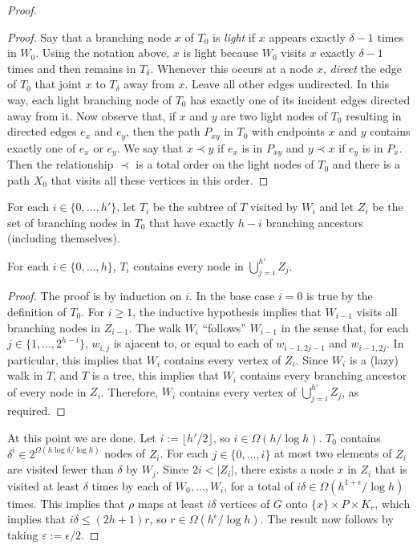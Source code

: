 \documentclass{patmorin}
\newcommand{\defin}[1]{\emph{\color{brightmaroon}#1}}
\begin{document}
\begin{proof}
  \begin{proof}
    Say that a branching node $x$ of $T_0$ is \defin{light} if $x$ appears exactly $\delta-1$ times in $W_0$. Using the notation above, $x$ is light because $W_0$ visits $x$ exactly $\delta-1$ times and then remains in $T_\delta$.  Whenever this occurs at a node $x$, \defin{direct} the edge of $T_0$ that joint $x$ to $T_\delta$ away from $x$. Leave all other edges undirected.  In this way, each light branching node of $T_0$ has exactly one of its incident edges directed away from it.  Now observe that, if $x$ and $y$ are two light nodes of $T_0$ resulting in directed edges $e_x$ and $e_y$, then the path $P_{xy}$ in $T_0$ with endpoints $x$ and $y$ contains exactly one of $e_x$ or $e_y$.  We say that $x\prec y$ if $e_x$ is in $P_{xy}$ and $y\prec x$ if $e_y$ is in $P_x$.  Then the relationship $\prec$ is a total order on the light nodes of $T_0$ and there is a path $X_0$ that visits all these vertices in this order.
  \end{proof}


  For each $i\in\{0,\ldots,h'\}$, let $T_i$ be the subtree of $T$ visited by $W_i$ and let $Z_i$ be the set of branching nodes in $T_0$ that have exactly $h-i$ branching ancestors (including themselves).

  \begin{clm}
    For each $i\in\{0,\ldots,h\}$, $T_i$ contains every node in $\bigcup_{j=i}^{h'}Z_j$.
  \end{clm}

  \begin{proof}
    The proof is by induction on $i$. In the base case $i=0$ is true by the definition of $T_0$.  For $i\ge 1$, the inductive hypothesis implies that $W_{i-1}$ visits all branching nodes in $Z_{i-1}$. The walk $W_{i}$ ``follows'' $W_{i-1}$ in the sense that, for each $j\in\{1,\ldots,2^{h-i}\}$, $w_{i,j}$ is ajacent to, or equal to each of $w_{i-1,2j-1}$ and $w_{i-1,2j}$.  In particular, this implies that $W_i$ contains every vertex of $Z_i$. Since $W_i$ is a (lazy) walk in $T$, and $T$ is a tree, this implies that $W_i$ contains every branching ancestor of every node in $Z_i$.  Therefore, $W_i$ contains every vertex of $\bigcup_{j=i}^{h'} Z_j$, as required.
  \end{proof}

  At this point we are done.  Let $i:=\lfloor h'/2\rfloor$, so $i\in\Omega(h/\log h)$.  $T_0$ contains $\delta^i \in 2^{\Omega(h\log\delta/\log h)}$  nodes of $Z_i$.  For each $j\in\{0,\ldots,i\}$ at most two elements of $Z_i$ are visited fewer than $\delta$ by $W_j$.  Since $2i < |Z_i|$, there exists a node $x$ in $Z_i$ that is visited at least $\delta$ times by each of $W_0,\ldots,W_i$, for a total of $i\delta \in \Omega(h^{1+\epsilon}/\log h)$ times. This implies that $\rho$ maps at least $i\delta$ vertices of $G$ onto $\{x \}\times P\times K_r$, which implies that $i\delta\le (2h+1)r$, so $r\in\Omega(h^\epsilon/\log h)$.  The result now follows by taking $\varepsilon := \epsilon/2$.
\end{proof}
\end{document}
